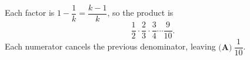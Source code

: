 Each factor is $1-\dfrac1k=\dfrac{k-1}{k}$, so the product is
\[\dfrac12\cdot\dfrac23\cdot\dfrac34\cdots\dfrac{9}{10}.\]
Each numerator cancels the previous denominator, leaving $\boxed{\textbf{(A)}\ \dfrac1{10}}$.
